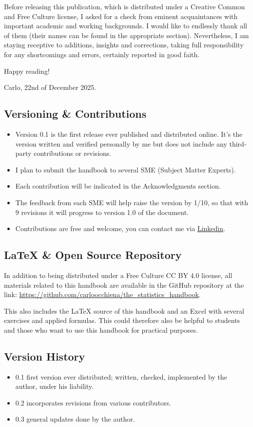 \documentclass{article}
\begin{document}
Before releasing this publication, which is distributed under a Creative Common and Free Culture license, I asked for a check from eminent acquaintances with important academic and working backgrounds. I would like to endlessly thank all of them (their names can be found in the appropriate section). Nevertheless, I am staying receptive to additions, insights and corrections, taking full responsibility for any shortcomings and errors, certainly reported in good faith.

Happy reading! 

Carlo, 22nd of December 2025.

\subsection{Versioning \& Contributions}
\begin{itemize}
    \item Version 0.1 is the first release ever published and distributed online. It's the version written and verified personally by me but does not include any third-party contributions or revisions. 
    \item I plan to submit the handbook to several SME (Subject Matter Experts). 
    \item Each contribution will be indicated in the Acknowledgments section. 
    \item The feedback from each SME will help raise the version by 1/10, so that with 9 revisions it will progress to version 1.0 of the document.
    \item Contributions are free and welcome, you can contact me via \href{https://www.linkedin.com/in/carloocchiena/}{Linkedin}. 
\end{itemize}


\subsection{\LaTeX{} \& Open Source Repository}
In addition to being distributed under a Free Culture CC BY 4.0 license, all materials related to this handbook are available in the GitHub repository at the link: \url{https://github.com/carloocchiena/the_statistics_handbook}.

This also includes the \LaTeX{} source of this handbook and an Excel with several exercises and applied formulas. This could therefore also be helpful to students and those who want to use this handbook for practical purposes. 

\subsection{Version History}
\begin{itemize}
    \item 0.1 first version ever distributed; written, checked, implemented by the author, under his liability.
    \item 0.2 incorporates revisions from various contributors.
    \item 0.3 general updates done by the author.
\end{itemize}
\end{document}
